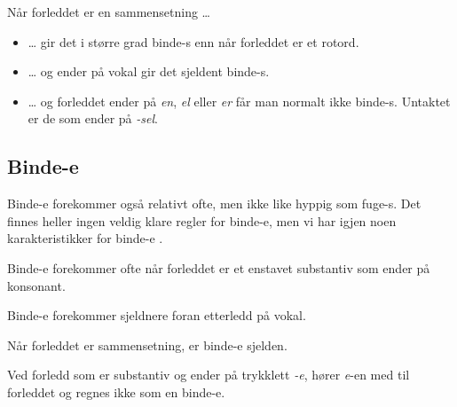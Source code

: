 \begin{items}
\begin{itemize}
	\end{itemize}
	
	\item Når forleddet er en sammensetning …
	\begin{itemize}
		\item … gir det i større grad binde-s enn når forleddet er et rotord.
	
		\newline
		
		\item … og ender på vokal gir det sjeldent binde-s.
		
		
		\item … og forleddet ender på \textit{en}, \textit{el} eller \textit{er} får man normalt ikke binde-s. Untaktet er de som ender på \textit{-sel}.
		
		\newline
		
	\end{itemize}
\end{items}

\subsection{Binde-e}
\label{sec:ord-bind2}

Binde-e forekommer også relativt ofte, men ikke like hyppig som fuge-s. Det finnes heller ingen veldig klare regler for binde-e, men vi har igjen noen karakteristikker for binde-e \cite{faarlund1997norsk}.

\begin{items}
	\item Binde-e forekommer ofte når forleddet er et enstavet substantiv som ender på konsonant. 
		
		
	\item Binde-e forekommer sjeldnere foran etterledd på vokal.

	 
	\item Når forleddet er sammensetning, er binde-e sjelden. 
	 

	\item Ved forledd som er substantiv og ender på trykklett \textit{-e}, hører \textit{e}-en med til forleddet og regnes ikke som en binde-e. 

\end{items}


